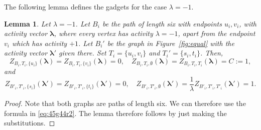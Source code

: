 \documentclass[11pt]{article}
\newtheorem{lemma}[theorem]{Lemma}
\def\lambdab{\ensuremath{\boldsymbol{\lambda}}}
\begin{document}
 
The following lemma defines the gadgets for the case $\lambda=-1$.



\begin{lemma}\label{lem:minusoneeqgadget}
Let $\lambda=-1$. Let $B_i$ be the path of length six with endpoints $u_i,v_i$, with activity vector $\lambdab$, where every vertex has activity $\lambda=-1$, apart from the endpoint $v_i$  
   which has activity $+1$. Let $B_i'$ be the graph in Figure~\ref{fig:equal} with the activity vector $\lambdab'$ given there. Set $T_i=\{u_i,v_i\}$ and $T_i'=\{s_i,t_i\}$. Then,
$$Z_{B_i,T_i,\{u_i\}}(\lambdab) = Z_{B_i,T_i,\{v_{i}\}}(\lambdab)=0, \quad Z_{B_i,T_i,\emptyset}(\lambdab) = Z_{B_i,T_i,T_i}(\lambdab)=C:=1,$$
and
$$Z_{B'_i,T'_i,\{s_i\}}(\lambdab') = Z_{B'_i,T'_i,\{t_i\}}(\lambdab') =0, \quad Z_{B'_i,T'_i,\emptyset}(\lambdab') =\frac{1}{\lambda} Z_{B'_i,T'_i,T'_i}(\lambdab')=1.$$
\end{lemma}
\begin{proof}
Note that both graphs are paths of length six.  We can therefore use the formula in \eqref{eq:45g44r2}. The lemma therefore follows by just making the substitutions.
\end{proof}
\end{document}
